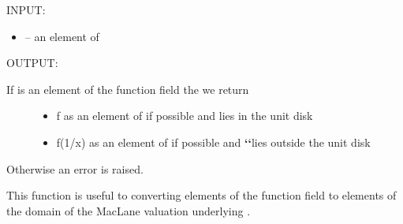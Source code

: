 \documentclass[letterpaper,10pt,english]{sphinxmanual}
\begin{document}
\begin{fulllineitems}
\begin{fulllineitems}
INPUT:
\begin{itemize}
\item {} 
 -- an element of 

\end{itemize}

OUTPUT:
\begin{description}
\item[{If  is an element of the function field  the we return}] \leavevmode\begin{itemize}
\item {} 
f as an element of  if possible and  lies in the unit disk

\item {} 
f(1/x) as an element of  if possible and {\color{red}\bfseries{}{}`{}`}lies outside the unit disk

\end{itemize}

\end{description}

Otherwise an error is raised.

This function is useful to converting elements of the function field to
elements of the domain of the MacLane valuation underlying .

\end{fulllineitems}


\end{fulllineitems}

\end{document}
